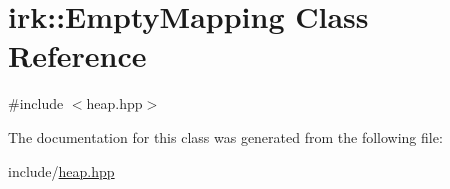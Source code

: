 \hypertarget{classirk_1_1EmptyMapping}{}\section{irk\+:\+:Empty\+Mapping Class Reference}
\label{classirk_1_1EmptyMapping}


{\ttfamily \#include $<$heap.\+hpp$>$}



The documentation for this class was generated from the following file\+:\begin{DoxyCompactItemize}
\item 
include/\mbox{\hyperlink{heap_8hpp}{heap.\+hpp}}\end{DoxyCompactItemize}
